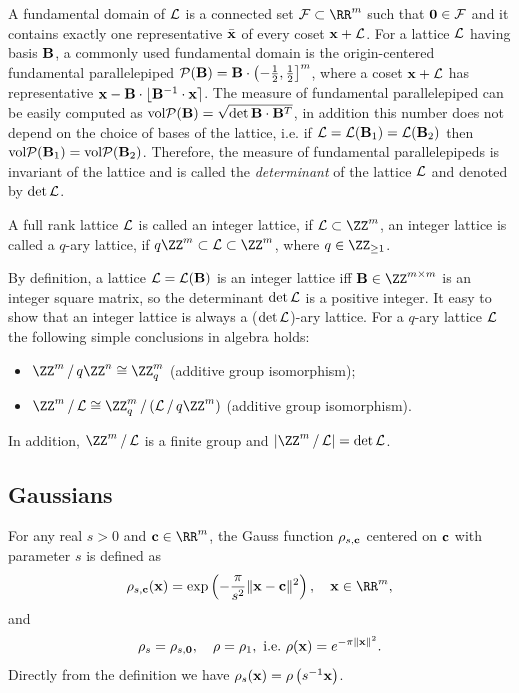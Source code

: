 \documentclass{fundam}
\begin{document}
A fundamental domain of $\mathcal{L}$ is a connected set $\Fun\subset \RR^{m}$ such that $\mathbf{0}\in\mathcal{F}$ and it contains exactly one representative $\bar{\mathbf{x}}$ of every coset $\mathbf{x}+\mathcal{L}$. For a lattice $\mathcal{L}$ having basis $\mathbf{B}$, a commonly used fundamental domain is the origin-centered fundamental parallelepiped $\mathcal{P}(\mathbf{B}) = \mathbf{B}\cdot \left( -\frac{1}{2}, \frac{1}{2}  \right]^{m}$, where a coset $\mathbf{x}+\mathcal{L}$ has representative $\mathbf{x} - \mathbf{B}\cdot \lfloor \mathbf{B}^{-1}\cdot \mathbf{x}\rceil$. The measure of fundamental parallelepiped  can be easily computed as $\text{vol} \mathcal{P}(\mathbf{B}) = \sqrt{\det\mathbf{B}\cdot \mathbf{B}^{T}}$, in addition this number does not depend on the choice of bases of the lattice, i.e. if $\mathcal{L} = \mathcal{L}(\mathbf{B}_{1}) = \mathcal{L}(\mathbf{B}_{2})$ then $\text{vol} \mathcal{P}(\mathbf{B}_{1}) = \text{vol} \mathcal{P}(\mathbf{B}_{2})$. Therefore, the measure of fundamental parallelepipeds is invariant of the lattice and is called the \textit{determinant} of the lattice $\mathcal{L}$ and denoted by $\det\mathcal{L}$.

A full rank lattice $\mathcal{L}$ is called an integer lattice, if $\Lat \subset \ZZ^{m}$, an integer lattice is called a $q$-ary lattice, if $q\ZZ^{m}\subset \Lat \subset \ZZ^{m}$, where $q\in\ZZ_{\geq 1}$. 

By definition, a lattice $\mathcal{L}=\mathcal{L}(\mathbf{B})$ is an integer lattice iff $\vr{B}\in \ZZ^{m\times m}$ is an integer square matrix, so the determinant $\det \mathcal{L}$ is a positive integer. It easy to show that an integer lattice is always a ($\det \mathcal{L}$)-ary lattice. For a $q$-ary lattice $\mathcal{L}$ the following simple conclusions in algebra holds:
\begin{itemize}
	\item $\quotient{\ZZ^{m}}{q\ZZ^{n}} \cong \ZZ_{q}^{m}$ (additive group isomorphism);
	\item $\quotient{\ZZ^{m}}{\Lat} \cong \quotient{\ZZ_{q}^{m}}{(\quotient{\Lat}{q\ZZ^{m}})}$ (additive group isomorphism).
\end{itemize}
In addition, $\quotient{\ZZ^{m}}{\Lat} $ is a finite group and $|\quotient{\ZZ^{m}}{\Lat} | = \det \Lat$.

\subsection{Gaussians}\label{Gaussian}
For any real $s>0$ and $\vr{c}\in\RR^{m}$, the Gauss function $\rho_{s,\mathbf{c}}$ centered on $\mathbf{c}$ with parameter $s$ is defined as
\begin{align*}
	\rho_{s,\vr{c}}(\vr{x})  = \exp \left(-\frac{\pi}{s^{2}}\|\vr{x} - \vr{c} \|^{2}\right), ~~~\vr{x}\in\RR^{m},
\end{align*}
and 
\begin{align*}
	\rho_{s} = \rho_{s, \mathbf{0}}, ~~~\rho = \rho_{1},~\text{i.e.}~ \rho(\mathbf{x}) = e^{-\pi\| \mathbf{x} \|^{2}}.  
\end{align*}
Directly from the definition we have $\rho_{s}(\mathbf{x}) = \rho\left(  {s}^{-1} \mathbf{x}\right)$.
\end{document}
